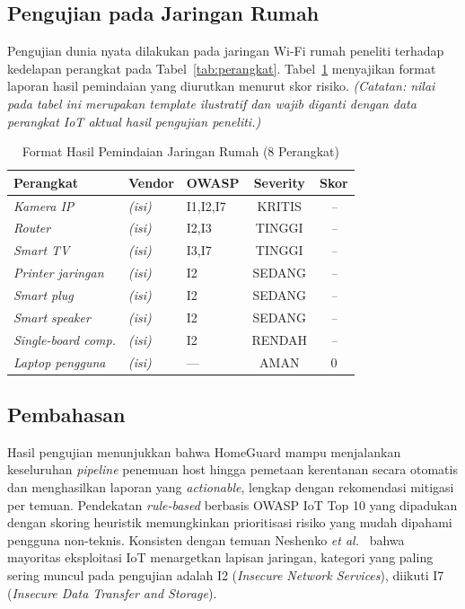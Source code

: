 \subsection{Pengujian pada Jaringan Rumah}
Pengujian dunia nyata dilakukan pada jaringan Wi-Fi rumah peneliti terhadap
kedelapan perangkat pada Tabel~\ref{tab:perangkat}. Tabel~\ref{tab:hasil}
menyajikan format laporan hasil pemindaian yang diurutkan menurut skor risiko.
\textit{(Catatan: nilai pada tabel ini merupakan template ilustratif dan wajib
diganti dengan data perangkat IoT aktual hasil pengujian peneliti.)}

\begin{table}[ht]
    \centering
    \caption{Format Hasil Pemindaian Jaringan Rumah (8 Perangkat)}
    \label{tab:hasil}
    \begin{tabular}{|l|l|l|c|c|}
        \hline
        \textbf{Perangkat} & \textbf{Vendor} & \textbf{OWASP} &
        \textbf{Severity} & \textbf{Skor} \\
        \hline
        \textit{Kamera IP} & \textit{(isi)} & I1,I2,I7 & KRITIS & \textit{--} \\
        \textit{Router} & \textit{(isi)} & I2,I3 & TINGGI & \textit{--} \\
        \textit{Smart TV} & \textit{(isi)} & I3,I7 & TINGGI & \textit{--} \\
        \textit{Printer jaringan} & \textit{(isi)} & I2 & SEDANG & \textit{--} \\
        \textit{Smart plug} & \textit{(isi)} & I2 & SEDANG & \textit{--} \\
        \textit{Smart speaker} & \textit{(isi)} & I2 & SEDANG & \textit{--} \\
        \textit{Single-board comp.} & \textit{(isi)} & I2 & RENDAH & \textit{--} \\
        \textit{Laptop pengguna} & \textit{(isi)} & --- & AMAN & 0 \\
        \hline
    \end{tabular}
\end{table}

\subsection{Pembahasan}
Hasil pengujian menunjukkan bahwa HomeGuard mampu menjalankan keseluruhan
\textit{pipeline} penemuan host hingga pemetaan kerentanan secara otomatis
dan menghasilkan laporan yang \textit{actionable}, lengkap dengan
rekomendasi mitigasi per temuan. Pendekatan \textit{rule-based} berbasis
OWASP IoT Top 10 yang dipadukan dengan skoring heuristik memungkinkan
prioritisasi risiko yang mudah dipahami pengguna non-teknis. Konsisten
dengan temuan Neshenko \textit{et al.}~\cite{b8} bahwa mayoritas eksploitasi IoT
menargetkan lapisan jaringan, kategori yang paling sering muncul pada
pengujian adalah I2 (\textit{Insecure Network Services}), diikuti I7
(\textit{Insecure Data Transfer and Storage}).

